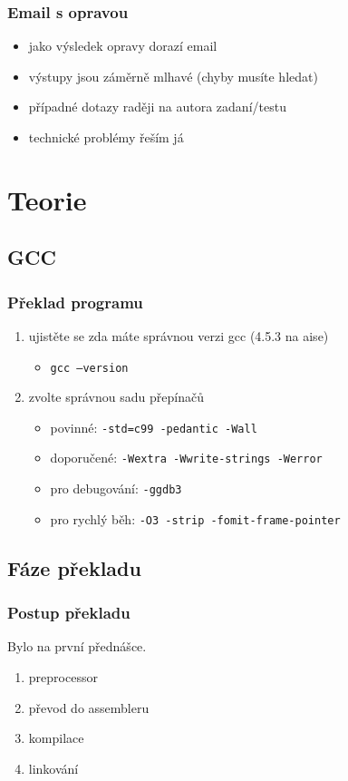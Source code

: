 \begin{frame}
	\frametitle{Email s opravou}
	\begin{itemize}
		\item{jako výsledek opravy dorazí email}
		\item{výstupy jsou záměrně mlhavé (chyby musíte hledat)}
		\item{případné dotazy raději na autora zadaní/testu}
		\item{technické problémy řeším já}
	\end{itemize}
\end{frame}


\section{Teorie}
\subsection{GCC}

\begin{frame}
	\frametitle{Překlad programu}
	\begin{enumerate}
		\item{ujistěte se zda máte správnou verzi gcc (4.5.3 na aise)}
		\begin{itemize}
			\item{\texttt{gcc --version}}
		\end{itemize}
		\item{zvolte správnou sadu přepínačů}
		\begin{itemize}
			\item{\alert{povinné:} \texttt{-std=c99 -pedantic -Wall}}
			\item{\alert{doporučené:} \texttt{-Wextra -Wwrite-strings -Werror}}
			\item{pro debugování: \texttt{-ggdb3}}
			\item{pro rychlý běh: \texttt{-O3 -strip -fomit-frame-pointer}}
		\end{itemize}
	\end{enumerate}
\end{frame}

\subsection{Fáze překladu}

\begin{frame}
	\frametitle{Postup překladu}
	Bylo na první přednášce.
	\begin{enumerate}
		\item{preprocessor}
		\item{převod do assembleru}
		\item{kompilace}
		\item{linkování}
	\end{enumerate}
\end{frame}

